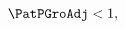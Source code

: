   \begin{equation}\begin{gathered}\begin{aligned}
    \PatPGroAdj  & < 1 \label{eq:GICNrm},
  \end{aligned}\end{gathered}\end{equation}
